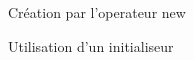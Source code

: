 \begin{frame}{Cr\'eation par l'operateur new}

\end{frame}

\begin{frame}{Utilisation d'un initialiseur}

\end{frame}